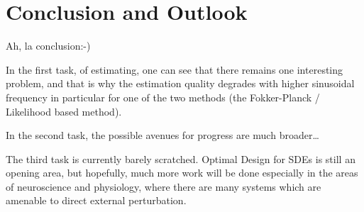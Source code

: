 \documentclass{report}
\begin{document}
\chapter{Conclusion and Outlook}
\label{ch:conclusion}
Ah, la conclusion:-) 

In the first task, of estimating, one can see that there remains one interesting
problem, and that is why the estimation quality degrades with higher sinusoidal
frequency in particular for one of the two methods (the
Fokker-Planck / Likelihood based method).

In the second task, the possible avenues for progress are much broader\ldots 

The third task is currently barely scratched. Optimal Design for SDEs is still
an opening area, but hopefully, much more work will be done especially in the
areas of neuroscience and physiology, where there are many systems which are
amenable to direct external perturbation.


\cleardoublepage
% 


\end{document}
